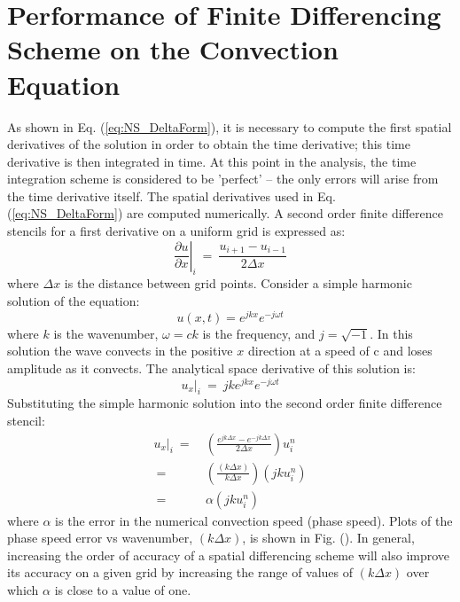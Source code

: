 \documentclass[conf]{new-aiaa}
\begin{document}
\section{Performance of Finite Differencing Scheme on the Convection Equation}
As shown in Eq. (\ref{eq:NS_DeltaForm}), it is necessary to compute the first spatial derivatives of the solution in order to obtain the time derivative; this time derivative is then integrated in time. 
At this point in the analysis, the time integration scheme is considered to be ’perfect’ – the only errors will arise from the time derivative itself.
The spatial derivatives used in Eq. (\ref{eq:NS_DeltaForm}) are computed numerically. 
A second order finite difference stencils for a first derivative on a uniform grid is expressed as:
\begin{equation*}
	\left.\frac{\partial{u}}{\partial{x}}\right|_{i}~=~\frac{u_{i+1}-u_{i-1}}{2\Delta{x}}
\end{equation*}
where $\Delta{x}$ is the distance between grid points. Consider a simple harmonic solution of the equation:
\begin{equation*}
	u(x, t) = e^{jkx}e^{-j\omega{t}}
\end{equation*}
where $k$ is the wavenumber, $\omega=ck$ is the frequency, and $j=\sqrt{-1}$. In this solution the wave convects in the positive $x$ direction at a speed of c and loses amplitude as it convects. The analytical space derivative of this solution is:
\begin{equation*}
	\left.u_x\right|_{i}~=~jke^{jkx}e^{-j\omega{t}}
\end{equation*}
Substituting the simple harmonic solution into the second order finite difference stencil:
\begin{equation*}
	\begin{split}
		\left.u_x\right|_{i}~=&~\left(\frac{e^{jk\Delta{x}} - e^{-jk\Delta{x}}}{2\Delta{x}}\right)u_i^n \\
		~=&~\left(\frac{\left(k\Delta{x}\right)}{k\Delta{x}} \right)\left(jku_i^n\right) \\
		~=&~\alpha\left(jku_i^n\right)
	\end{split}
\end{equation*}
where $\alpha$ is the error in the numerical convection speed (phase speed). 
Plots of the phase speed error vs wavenumber, $\left(k\Delta{x}\right)$, is shown in Fig. (). 
In general, increasing the order of accuracy of a spatial differencing scheme will also improve its accuracy on a given grid by increasing the range of values of $\left(k\Delta{x}\right)$ over which $\alpha$ is close to a value of one. 
\end{document}
